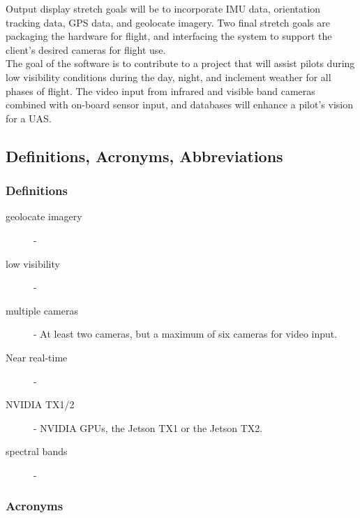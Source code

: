 \documentclass[letterpaper,10pt,serif,draftclsnofoot,onecolumn,compsoc,titlepage]{IEEEtran}
\begin{document}
Output display stretch goals will be to incorporate IMU data, orientation tracking 
data, GPS data, and geolocate imagery. Two final stretch goals are packaging the 
hardware for flight, and interfacing the system to support the client's desired 
cameras for flight use.\\

The goal of the software is to contribute to a project that will assist pilots during 
low visibility conditions during the day, night, and inclement weather for all phases 
of flight. The video input from infrared and visible band cameras combined with 
on-board sensor input, and databases will enhance a pilot's vision for a UAS.\\

\subsection{Definitions, Acronyms, Abbreviations}

\subsubsection{Definitions}

\begin{description}
	\item[geolocate imagery] - 
	\item[low visibility] - 
	\item[multiple cameras] - At least two cameras, but a maximum of six cameras for 
	video input.
	\item[Near real-time] -
	\item[NVIDIA TX1/2] - NVIDIA GPUs, the Jetson TX1 or the Jetson TX2.
	\item[spectral bands] - 
\end{description}

\subsubsection{Acronyms}
\end{document}
